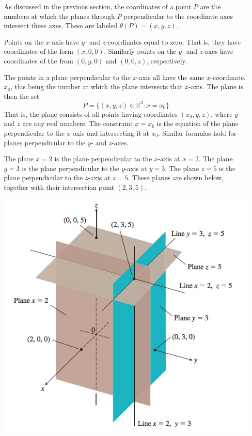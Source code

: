 \documentclass[12pt,letterpaper,reqno]{article}
\numberwithin{equation}{section}
\begin{document}
As discussed in the previous section, the coordinates of a point $P$ are the numbers at which the planes through $P$ perpendicular to the coordinate axes intersect these axes. These are labeled $\theta(P)=(x,y,z)$. 

Points on the $x$-axis have $y$- and $z$-coordinates equal to zero. That is, they have coordinates of the form $(x,0,0)$. Similarly points on the $y$- and $z$-axes have coordinates of the from $(0,y,0)$ and $(0,0,z)$, respectively.

The points in a plane perpendicular to the $x$-axis all have the same $x$-coordinate, $x_0$, this being the number at which the plane intersects that $x$-axis. The plane is then the set 
\begin{equation}
	P=\{(x,y,z) \in \mathbb{R}^3 : x=x_0\} 
\end{equation}
That is, the plane consists of all points having coordinates $(x_0,y,z)$, where $y$ and $z$ are any real numbers. The constraint $x=x_0$ is the equation of the plane perpendicular to the $x$-axis and intersecting it at $x_0$. Similar formulas hold for planes perpendicular to the $y$- and $z$-axes.

\begin{example}
The plane $x=2$ is the plane perpendicular to the $x$-axis at $x=2$. The plane $y=3$ is the plane perpendicular to the $y$-axis at $y=3$. The plane $z=5$ is the plane perpendicular to the $z$-axis at $z=5$. These planes are shown below, together with their intersection point $(2,3,5)$.
\end{example}

\begin{center}
	\includegraphics[scale=0.5]{figures_mvc/plane_235}
\end{center}
\end{document}
